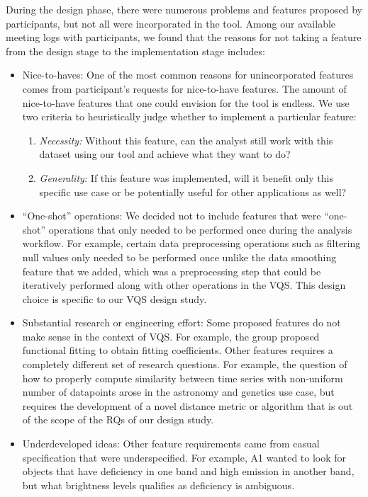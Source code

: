 {\par During the design phase, there were numerous problems and features proposed by participants, but not all were incorporated in the tool. Among our available meeting logs with participants, we found that the reasons for not taking a feature from the design stage to the implementation stage includes: 
\begin{itemize}
\item Nice-to-haves: One of the most common reasons for unincorporated features comes from participant's requests for nice-to-have features. The amount of nice-to-have features that one could envision for the tool is endless. We use 
two criteria to heuristically judge whether to implement a particular feature:
\begin{enumerate}
\item \textit{Necessity:} Without this feature, can the analyst still work with this dataset using our tool and achieve what they want to do? 
\item \textit{Generality:} If this feature was implemented, will it benefit only this specific use case or be potentially useful for other applications as well?
\end{enumerate}
\item ``One-shot'' operations: We decided not to include features that were ``one-shot'' operations that only needed to be performed once during the analysis workflow. For example, certain data preprocessing operations such as filtering null values only needed to be performed once unlike the data smoothing feature that we added, which was a preprocessing step that could be iteratively performed along with other operations in the VQS. This design choice is specific to our VQS design study.
\item Substantial research or engineering effort: Some proposed features do not make sense in the context of VQS. For example, the \matsci group proposed functional fitting to obtain fitting coefficients. Other features requires a completely different set of research questions. For example, the question of how to properly compute similarity between time series with non-uniform number of datapoints arose in the astronomy and genetics use case, but requires the development of a novel distance metric or algorithm that is out of the scope of the RQs of our design study.
\item Underdeveloped ideas: Other feature requirements came from casual specification that were underspecified. For example, A1 wanted to look for objects that have deficiency in one band and high emission in another band, but what brightness levels qualifies as deficiency is ambiguous.

\end{itemize}}
